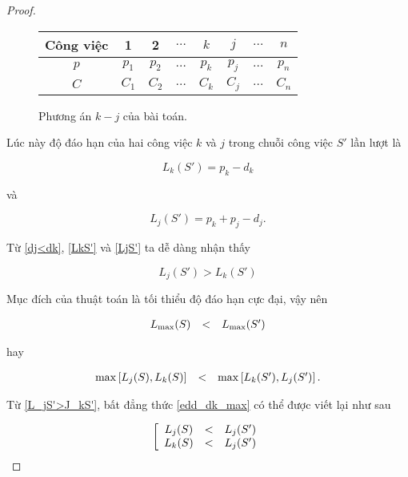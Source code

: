 \documentclass[12pt,a4paper]{report}
\begin{document}
\begin{proof}
	\begin{figure}[h!]
		\centering
		 \begin{tabular}{|c | c c c c c c c |} 
		 \hline
		 Công việc & 1 & 2 & $\ldots$ & $k$ & $j$ & $\ldots$ & $n$ \\
		 \hline\hline
		 $p$ & $p_1$ & $p_2$ & $\ldots$ & $p_k$ & $p_j$ & $\ldots$ & $p_n$ \\
		 $C$ & $C_1$ & $C_2$ & $\ldots$ & $C_k$ & $C_j$ & $\ldots$ & $C_n$ \\
		 \hline
		 \end{tabular}
	\caption{\label{jk_edd2}Phương án $k - j$ của bài toán.}
	\end{figure}

	Lúc này độ đáo hạn của hai công việc $k$ và $j$ trong chuỗi công việc $S'$ lần lượt là

	\begin{equation} \label{LkS'}
		L_k(S') = p_k - d_k
	\end{equation}

	và

	\begin{equation} \label{LjS'}
		L_j(S') = p_k + p_j - d_j.
	\end{equation}

	Từ \eqref{dj<dk}, \eqref{LkS'} và \eqref{LjS'} ta dễ dàng nhận thấy

	\begin{equation} \label{L_jS'>J_kS'}
		L_j(S') > L_k(S')
	\end{equation}

	Mục đích của thuật toán là tối thiểu độ đáo hạn cực đại, vậy nên

	\begin{equation}
	\begin{array}{c c c}
		L_{\max}(S) & < & L_{\max}(S')
	\end{array}
	\end{equation}

	hay

	\begin{equation} \label{edd_dk_max}
		\begin{array}{c c c}
			\max \left[ L_j(S), L_k(S) \right] & < & \max \left[ L_k(S'), L_j(S') \right].
		\end{array}
	\end{equation}

	Từ \eqref{L_jS'>J_kS'}, bất đẳng thức \eqref{edd_dk_max} có thể được viết lại như sau
	
	\begin{equation}
		\left[
			\begin{array}{c c c}
				L_j(S) & < & L_j(S') \\
				L_k(S) & < & L_j(S')
			\end{array}
		\right.
	\end{equation}


\end{proof}
\end{document}
